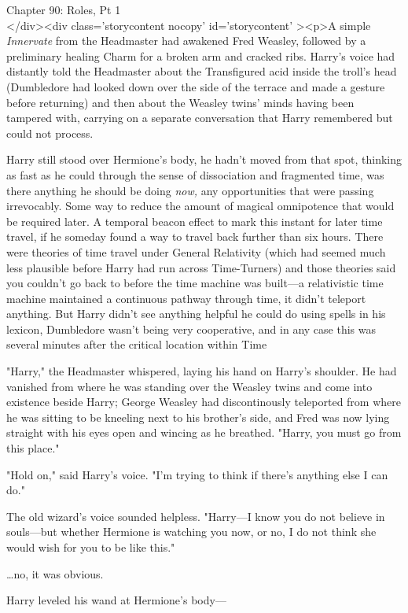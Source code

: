 
Chapter 90: Roles, Pt 1\\
</div><div  class='storycontent nocopy' id='storycontent' ><p>A simple \emph{Innervate} from the Headmaster had awakened Fred Weasley, followed by a preliminary healing Charm for a broken arm and cracked ribs. Harry's voice had distantly told the Headmaster about the Transfigured acid inside the troll's head (Dumbledore had looked down over the side of the terrace and made a gesture before returning) and then about the Weasley twins' minds having been tampered with, carrying on a separate conversation that Harry remembered but could not process.

Harry still stood over Hermione's body, he hadn't moved from that spot, thinking as fast as he could through the sense of dissociation and fragmented time, was there anything he should be doing \emph{now,} any opportunities that were passing irrevocably. Some way to reduce the amount of magical omnipotence that would be required later. A temporal beacon effect to mark this instant for later time travel, if he someday found a way to travel back further than six hours. There were theories of time travel under General Relativity (which had seemed much less plausible before Harry had run across Time-Turners) and those theories said you couldn't go back to before the time machine was built---a relativistic time machine maintained a continuous pathway through time, it didn't teleport anything. But Harry didn't see anything helpful he could do using spells in his lexicon, Dumbledore wasn't being very cooperative, and in any case this was several minutes after the critical location within Time

"Harry," the Headmaster whispered, laying his hand on Harry's shoulder. He had vanished from where he was standing over the Weasley twins and come into existence beside Harry; George Weasley had discontinously teleported from where he was sitting to be kneeling next to his brother's side, and Fred was now lying straight with his eyes open and wincing as he breathed. "Harry, you must go from this place."

"Hold on," said Harry's voice. "I'm trying to think if there's anything else I can do."

The old wizard's voice sounded helpless. "Harry---I know you do not believe in souls---but whether Hermione is watching you now, or no, I do not think she would wish for you to be like this."

{\ldots}no, it was obvious.

Harry leveled his wand at Hermione's body---

